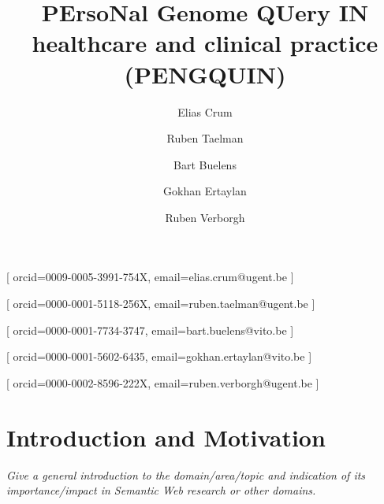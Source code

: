 \documentclass{article}
\begin{document}
\title{PErsoNal Genome QUery IN healthcare and clinical practice (PENGQUIN)}
\author[1,2]{Elias Crum}[
orcid=0009-0005-3991-754X,
email=elias.crum@ugent.be
]
\cormark[1]

\author[1]{Ruben Taelman}[
orcid=0000-0001-5118-256X,
email=ruben.taelman@ugent.be
]

\author[2]{Bart Buelens}[
orcid=0000-0001-7734-3747,
email=bart.buelens@vito.be
]

\author[2]{Gokhan Ertaylan}[
orcid=0000-0001-5602-6435,
email=gokhan.ertaylan@vito.be
]

\author[1]{Ruben Verborgh}[
orcid=0000-0002-8596-222X,
email=ruben.verborgh@ugent.be
]

\address [1] {IDLab, Department of Electronics and Information Systems, Ghent University -- imec, Belgium}
\address [2] {Flemish institute for Technological Research (VITO) Mol, Belgium}


\maketitle


\section{Introduction and Motivation}
\textit{Give a general introduction to the domain/area/topic and indication of its importance/impact in Semantic Web research or other domains.} 
\end{document}
